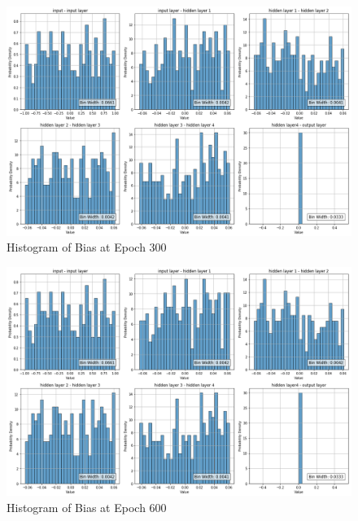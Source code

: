 \documentclass{ioereport}
\begin{document}
    \begin{figure}[H]
        \centering
        \includegraphics[width=\linewidth]{assets/audio histogram/epoch300Bias.png}
        \caption{Histogram of Bias at Epoch 300}
        \label{fig:audio-bias-300}
    \end{figure}

    \begin{figure}[H]
        \centering
        \includegraphics[width=\linewidth]{assets/audio histogram/epoch600Bias.png}
        \caption{Histogram of Bias at Epoch 600}
        \label{fig:audio-bias-600}
    \end{figure}
\end{document}
